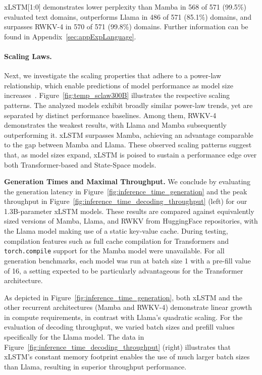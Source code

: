 xLSTM[1:0] demonstrates lower perplexity than Mamba in 568 of 571 (99.5\%) evaluated text domains, outperforms Llama in 486 of 571 (85.1\%) domains, and surpasses RWKV-4 in 570 of 571 (99.8\%) domains. Further information can be found in Appendix~\ref{sec:appExpLanguage}.

\paragraph{Scaling Laws.} Next, we investigate the scaling properties that adhere to a power-law relationship, which enable predictions of model performance as model size increases~\citep{Kaplan:20,Brown:20short}. Figure~\ref{fig:temp_sclaw300B} illustrates the respective scaling patterns. The analyzed models exhibit broadly similar power-law trends, yet are separated by distinct performance baselines. Among them, RWKV-4 demonstrates the weakest results, with Llama and Mamba subsequently outperforming it. xLSTM surpasses Mamba, achieving an advantage comparable to the gap between Mamba and Llama. These observed scaling patterns suggest that, as model sizes expand, xLSTM is poised to sustain a performance edge over both Transformer-based and State-Space models.

\textbf{Generation Times and Maximal Throughput.} We conclude by evaluating the generation latency in Figure~\ref{fig:inference_time_generation} and the peak throughput in Figure~\ref{fig:inference_time_decoding_throughput} (left) for our 1.3B-parameter xLSTM models. These results are compared against equivalently sized versions of Mamba, Llama, and RWKV from HuggingFace repositories, with the Llama model making use of a static key-value cache. During testing, compilation features such as full cache compilation for Transformers and \texttt{torch.compile} support for the Mamba model were unavailable. For all generation benchmarks, each model was run at batch size 1 with a pre-fill value of 16, a setting expected to be particularly advantageous for the Transformer architecture.

As depicted in Figure~\ref{fig:inference_time_generation}, both xLSTM and the other recurrent architectures (Mamba and RWKV-4) demonstrate linear growth in compute requirements, in contrast with Llama’s quadratic scaling. For the evaluation of decoding throughput, we varied batch sizes and prefill values specifically for the Llama model. The data in Figure~\ref{fig:inference_time_decoding_throughput} (right) illustrates that xLSTM’s constant memory footprint enables the use of much larger batch sizes than Llama, resulting in superior throughput performance.

